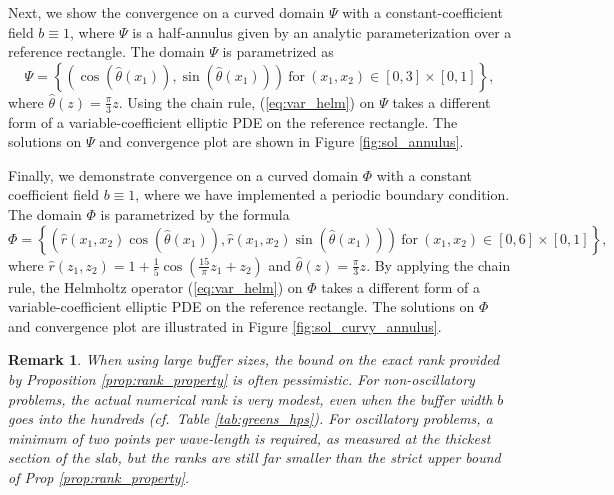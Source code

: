 \documentclass[11pt]{amsart}
\newtheorem{remark}{Remark}%
\begin{document}
Next, we show the convergence on a curved domain $\Psi$ with a constant-coefficient field 
$b \equiv 1$, where $\Psi$ is a half-annulus given by an analytic parameterization over a reference rectangle. 
The domain $\Psi$ is parametrized as
\begin{equation}
    \Psi =\left\{ \left( \cos \left( \hat{\theta}(x_1) \right) , \sin \left( \hat{\theta}(x_1) \right) \right)\ \text{for}\ (x_1,x_2) \in [0,3] \times [0,1] \right\},
\label{eq:parametrization_annulus}
\end{equation}
where $\hat{\theta}(z) = \frac \pi 3 z$.
Using the chain rule, (\ref{eq:var_helm}) on $\Psi$ takes a different form of a variable-coefficient elliptic PDE on the reference rectangle.
The solutions on $\Psi$ and convergence plot are shown in Figure \ref{fig:sol_annulus}.


Finally, we demonstrate convergence on a curved domain $\Phi$ with a constant coefficient field $b \equiv 1$, 
where we have implemented a periodic boundary condition. The domain $\Phi$ is parametrized by the formula
\begin{equation}
    \Phi =\left\{ \left( \hat{r}(x_1,x_2) \cos \left( \hat{\theta}(x_1) \right) , \hat{r}(x_1,x_2) \sin \left( \hat{\theta}(x_1) \right) \right)\ \text{for}\ (x_1,x_2) \in [0,6] \times [0,1] \right\},
\label{eq:parametrization_curvy_annulus}
\end{equation}
where $\hat{r}(z_1,z_2) = 1 + \frac 1 5 \cos \left( \frac{15}{\pi} z_1 + z_2 \right)$
and $\hat{\theta}(z) = \frac \pi 3 z$.
By applying the chain rule, the Helmholtz operator (\ref{eq:var_helm}) on $\Phi$ takes a different form of a variable-coefficient elliptic PDE on the reference rectangle. The solutions on $\Phi$ and convergence plot are illustrated in Figure \ref{fig:sol_curvy_annulus}.

\vspace{0.5em}

\begin{remark}
When using large buffer sizes, the bound on the exact rank provided by Proposition \ref{prop:rank_property} is often pessimistic. 
For non-oscillatory problems, the actual numerical rank is very modest, even when the buffer width $b$ goes into the hundreds (cf.~Table \ref{tab:greens_hps}).
For oscillatory problems, a minimum of two points per wave-length is required, as measured at the thickest section of the slab, but the ranks are still far smaller than the strict upper bound of Prop \ref{prop:rank_property}.
\end{remark}
\end{document}
